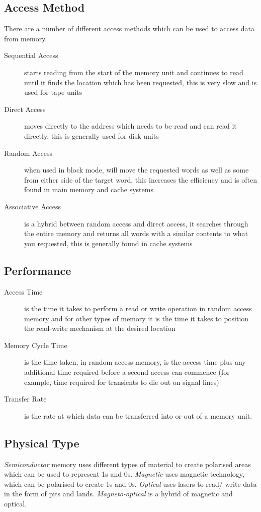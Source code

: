 \subsection{Access Method}
There are a number of different access methods which can be used to access data from memory. 
\begin{description}
    \item[Sequential Access] starts reading from the start of the memory unit and continues to read until it finds the location which has been requested, this is very slow and is used for tape units
    \item[Direct Access] moves directly to the address which needs to be read and can read it directly, this is generally used for disk units
    \item[Random Access] when used in block mode, will move the requested words as well as some from either side of the target word, this increases the efficiency and is often found in main memory and cache systems
    \item[Associative Access] is a hybrid between random access and direct access, it searches through the entire memory and returns all words with a similar contents to what you requested, this is generally found in cache systems
\end{description}

\subsection{Performance}
\begin{description}
    \item[Access Time] is the time it takes to perform a read or write operation in random access memory and for other types of memory it is the time it takes to position the read-write mechanism at the desired location
    \item[Memory Cycle Time] is the time taken, in random access memory, is the access time plus any additional time required before a second access can commence (for example, time required for transients to die out on signal lines)
    \item[Transfer Rate] is the rate at which data can be transferred into or out of a memory unit. 
\end{description}
\subsection{Physical Type}
\textit{Semiconductor} memory uses different types of material to create polarised areas which can be used to represent 1s and 0s. \textit{Magnetic} uses magnetic technology, which can be polarised to create 1s and 0s. \textit{Optical} uses lasers to read/ write data in the form of pits and lands. \textit{Magneto-optical} is a hybrid of magnetic and optical.
